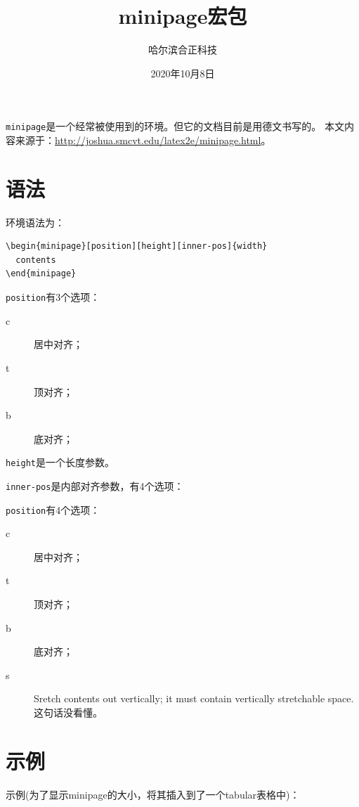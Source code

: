 \documentclass{article}
\title{minipage宏包}
\author{哈尔滨合正科技}
\date{2020年10月8日}
\begin{document}
\maketitle

\texttt{minipage}是一个经常被使用到的环境。但它的文档目前是用德文书写的。
本文内容来源于：\url{http://joshua.smcvt.edu/latex2e/minipage.html}。

\section{语法}

环境语法为：

\begin{verbatim}
\begin{minipage}[position][height][inner-pos]{width}
  contents
\end{minipage}
\end{verbatim}

\texttt{position}有3个选项：
\begin{description}
\item[c] 居中对齐；
\item[t] 顶对齐；
\item[b] 底对齐；
\end{description}

\texttt{height}是一个长度参数。

\texttt{inner-pos}是内部对齐参数，有4个选项：

\texttt{position}有4个选项：
\begin{description}
\item[c] 居中对齐；
\item[t] 顶对齐；
\item[b] 底对齐；
\item[s] Sretch contents out vertically; it must contain vertically
  stretchable space. 这句话没看懂。
\end{description}

\section{示例}

示例(为了显示minipage的大小，将其插入到了一个tabular表格中)：
\end{document}
